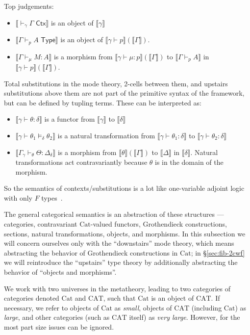 \documentclass[10pt]{article}
\theoremstyle{definition}
\newcommand{\yields}{\vdash}
\newcommand{\CTX}{\,\,\mathsf{Ctx}}
\newcommand{\TYPE}{\,\,\mathsf{Type}}
\newcommand\mm[1]{\llbracket #1 \rrbracket}
\newcommand\Cat{\mathrm{Cat}}
\newcommand\CAT{\mathrm{CAT}}
\begin{document}
Top judgements: 
\begin{itemize}
\item $\mm{\yields_\gamma \Gamma \CTX}$ is an object of $\mm{\gamma}$
\item $\mm{\Gamma \yields_p A \TYPE}$ is an object of $\mm{\gamma \yields p}(\mm{\Gamma})$.
\item $\mm{\Gamma \yields_\mu M : A}$ is a morphism from $\mm{\gamma \yields \mu : p}(\mm{\Gamma})$ to $\mm{\Gamma \yields_p A}$ in $\mm{\gamma \yields p}(\mm{\Gamma})$.
\end{itemize}

Total substitutions in the mode theory, 2-cells between them, and
upstairs substitutions above them are not part of the primitive syntax
of the framework, but can be defined by tupling terms.
These can be interpreted as: 
\begin{itemize}
\item $\mm{\gamma \yields \theta : \delta}$ is a functor from $\mm{\gamma}$ to $\mm{\delta}$
\item $\mm{\gamma \yields \theta_1 \vDash_\delta \theta_2}$ is a natural
  transformation from $\mm{\gamma \yields \theta_1 : \delta}$ to
  $\mm{\gamma \yields \theta_2 : \delta}$
\item $\mm{\Gamma_{\gamma} \yields_\theta \Theta : \Delta_\delta}$ is a
  morphism from $\mm{\theta}(\mm{\Gamma})$ to $\mm{\Delta}$ in
  $\mm{\delta}$.
  Natural transformations act contravariantly because $\theta$ is in the
  domain of the morphism.  
  \end{itemize}
So the semantics of contexts/substitutions is a lot like 
one-variable adjoint logic with only $F$ types~\cite{ls15adjoint}.  

The general categorical semantics is an abstraction of these structures --- categories, contravariant $\Cat$-valued functors, Grothendieck constructions, sections, natural transformations, objects, and morphisms.
In this subsection we will concern ourselves only with the ``downstairs'' mode theory, which means abstracting the behavior of Grothendieck constructions in $\Cat$; in \S\ref{sec:fib-2cwf} we will reintroduce the ``upstairs'' type theory by additionally abstracting the behavior of ``objects and morphisms''.

We work with two universes in the metatheory, leading to two categories of categories denoted $\Cat$ and $\CAT$, such that $\Cat$ is an object of $\CAT$.
If necessary, we refer to objects of $\Cat$ as \emph{small}, objects of $\CAT$ (including $\Cat$) as \emph{large}, and other categories (such as $\CAT$ itself) as \emph{very large}.
However, for the most part size issues can be ignored.
\end{document}
